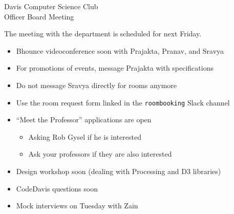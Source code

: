 \documentclass{article}
\begin{document}
\begin{Minutes}{Davis Computer Science Club\\Officer Board Meeting}
\missingExcused{}




\maketitle
The meeting with the department is scheduled for next Friday.
\begin{itemize}
\item Bhounce videoconference soon with Prajakta, Pranav, and Sravya
\end{itemize}
\begin{itemize}
\item For promotions of events, message Prajakta with specifications
\end{itemize}
\begin{itemize}
\item Do not message Sravya directly for rooms anymore
\item Use the room request form linked in the \texttt{roombooking} Slack channel
\item ``Meet the Professor'' applications are open
  \begin{itemize}
  \item Asking Rob Gysel if he is interested
  \item Ask your professors if they are also interested
  \end{itemize}
\item Design workshop soon (dealing with Processing and D3 libraries)
\end{itemize}
\begin{itemize}
\item CodeDavis questions soon
\item Mock interviews on Tuesday with Zain
\end{itemize}
\begin{itemize}

\end{itemize}
\end{Minutes}
\end{document}
